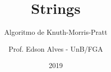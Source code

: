 \title{Strings}
\subtitle{Algoritmo de Knuth-Morris-Pratt}
\author{Prof. Edson Alves - UnB/FGA}
\date{2019}
